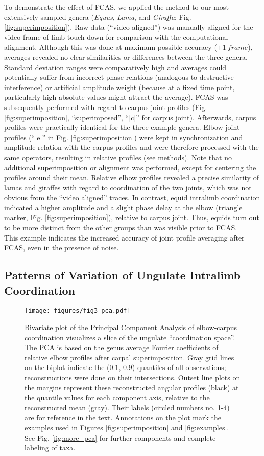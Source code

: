 To demonstrate the effect of FCAS, we applied the method to our most extensively sampled genera (\textit{Equus}, \textit{Lama}, and \textit{Giraffa}; Fig. \ref{fig:superimposition}).
Raw data (``video aligned'') was manually aligned for the video frame of limb touch down for comparison with the computational alignment.
Although this was done at maximum possible accuracy ($\pm 1\ frame$), averages revealed no clear similarities or differences between the three genera.
Standard deviation ranges were comparatively high and averages could potentially suffer from incorrect phase relations (analogous to destructive interference) or artificial amplitude weight (because at a fixed time point, particularly high absolute values might attract the average).
FCAS was subsequently performed with regard to carpus joint profiles (Fig. \ref{fig:superimposition}, ``superimposed'', ``[c]'' for carpus joint).
Afterwards, carpus profiles were practically identical for the three example genera.
Elbow joint profiles (``[e]'' in Fig. \ref{fig:superimposition}) were kept in synchronization and amplitude relation with the carpus profiles and were therefore processed with the same operators, resulting in relative profiles (see methods).
Note that no additional superimposition or alignment was performed, except for centering the profiles around their mean.
Relative elbow profiles revealed a precise similarity of lamas and giraffes with regard to coordination of the two joints, which was not obvious from the ``video aligned'' traces.
In contrast, equid intralimb coordination indicated a higher amplitude and a slight phase delay at the elbow (triangle marker, Fig. \ref{fig:superimposition}), relative to carpus joint.
Thus, equids turn out to be more distinct from the other groups than was visible prior to FCAS.
\\This example indicates the increased accuracy of joint profile averaging after FCAS, even in the presence of noise.

\subsection{Patterns of Variation of Ungulate Intralimb Coordination}

\begin{figure}[p]
\texttt{[image: figures/fig3\_pca.pdf]}
\caption{Bivariate plot of the Principal Component Analysis of elbow-carpus coordination visualizes a slice of the ungulate ``coordination space''.
The PCA is based on the genus average Fourier coefficients of relative elbow profiles after carpal superimposition.
Gray grid lines on the biplot indicate the ($0.1$, $0.9$) quantiles of all observations; reconstructions were done on their intersections.
Outset line plots on the margins represent these reconstructed angular profiles (black) at the quantile values for each component axis, relative to the reconstructed mean (gray).
Their labels (circled numbers no. 1-4) are for reference in the text.
Annotations on the plot mark the examples used in Figures \ref{fig:superimposition} and \ref*{fig:examples}.
See Fig. \ref*{fig:more_pca} for further components and complete labeling of taxa.
 }
\label{fig:pca}
\end{figure}



